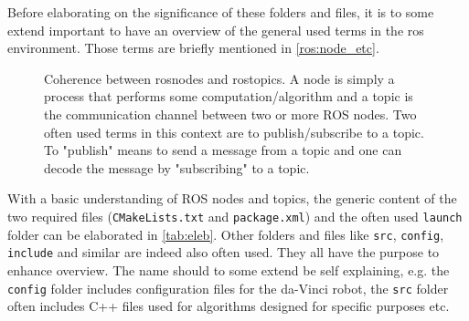 Before elaborating on the significance of these folders and files, it is to some extend important to have an overview of the general used terms in the \gls{ros} environment. Those terms are briefly mentioned in \autoref{ros:node_etc}. 
\begin{figure}[H]
\center
{}
\caption{Coherence between rosnodes and rostopics. A node is simply a process that performs some computation/algorithm and a topic is the communication channel between two or more ROS nodes. Two often used terms in this context are to publish/subscribe to a topic. To "publish" means to send a message from a topic and one can decode the message by "subscribing" to a topic.}
\label{ros:node_etc}
\end{figure}
With a basic understanding of ROS nodes and topics, the generic content of the two required files (\texttt{CMakeLists.txt} and \texttt{package.xml}) and the often used \texttt{launch} folder can be elaborated in \autoref{tab:eleb}. Other folders and files like \texttt{src}, \texttt{config}, \texttt{include} and similar are indeed also often used. They all have the purpose to enhance overview. The name should to some extend be self explaining, e.g. the \texttt{config} folder includes configuration files for the da-Vinci robot, the \texttt{src} folder often includes C++ files used for algorithms designed for specific purposes etc.
